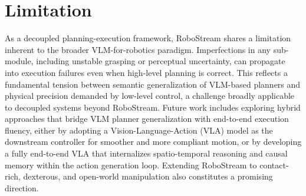 \section{Limitation}
\label{sec:limitation}
As a decoupled planning-execution framework, RoboStream shares a limitation inherent to the broader VLM-for-robotics paradigm. Imperfections in any sub-module, including unstable grasping or perceptual uncertainty, can propagate into execution failures even when high-level planning is correct. This reflects a fundamental tension between semantic generalization of VLM-based planners and physical precision demanded by low-level control, a challenge broadly applicable to decoupled systems beyond RoboStream. Future work includes exploring hybrid approaches that bridge VLM planner generalization with end-to-end execution fluency, either by adopting a Vision-Language-Action (VLA) model as the downstream controller for smoother and more compliant motion, or by developing a fully end-to-end VLA that internalizes spatio-temporal reasoning and causal memory within the action generation loop. Extending RoboStream to contact-rich, dexterous, and open-world manipulation also constitutes a promising direction.